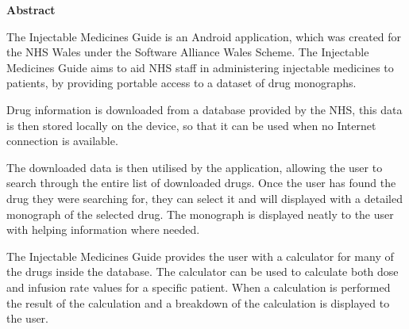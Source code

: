 \thispagestyle{empty}

\begin{center}
    {\LARGE\bf Abstract}
\end{center}

The Injectable Medicines Guide is an Android application, which was created for the NHS Wales under the Software Alliance Wales Scheme. The Injectable Medicines Guide aims to aid NHS staff in administering injectable medicines to patients, by providing portable access to a dataset of drug monographs.

Drug information is downloaded from a database provided by the NHS, this data is then stored locally on the device, so that it can be used when no Internet connection is available. 

The downloaded data is then utilised by the application, allowing the user to search through the entire list of downloaded drugs.  Once the user has found the drug they were searching for, they can select it and will displayed with a detailed monograph of the selected drug. The monograph is displayed neatly to the user with helping information where needed. 

The Injectable Medicines Guide provides the user with a calculator for many of the drugs inside the database. The calculator can be used to calculate both dose and infusion rate values for a specific patient. When a calculation is performed the result of the calculation and a breakdown of the calculation is displayed to the user.
